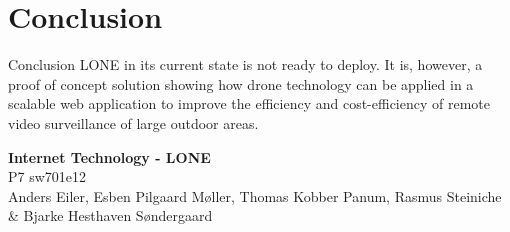 \section{Conclusion}
\begin{frame}{Conclusion}
LONE in its current state is not ready to deploy. It is, however, a proof of concept solution showing how drone technology can be applied in a scalable web application to improve the efficiency and cost-efficiency of remote video surveillance of large outdoor areas.
\end{frame}


\begin{frame}{}
	\begin{center}
		\huge \textbf{Internet Technology - LONE}\\
		\normalsize P7 sw701e12\\
		\tiny{Anders Eiler, Esben Pilgaard Møller, Thomas Kobber Panum,}
		\tiny{Rasmus Steiniche \& Bjarke Hesthaven Søndergaard}
	\end{center}
\end{frame}